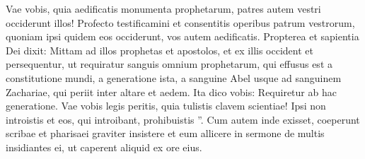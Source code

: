 \begin{biblechapter}
\begin{biblechapter}
\begin{biblechapter}
\begin{biblechapter}
\begin{biblechapter}
\begin{biblechapter}
\begin{biblechapter}
\begin{biblechapter}
\begin{biblechapter}
\begin{biblechapter}
\begin{biblechapter}
\verse Vae vobis, quia aedificatis monumenta prophetarum, patres autem vestri occiderunt illos! 
\verse Profecto testificamini et consentitis operibus patrum vestrorum, quoniam ipsi quidem eos occiderunt, vos autem aedificatis. 
\verse Propterea et sapientia Dei dixit: Mittam ad illos prophetas et apostolos, et ex illis occident et persequentur, 
 \verse ut requiratur sanguis omnium prophetarum, qui effusus est a constitutione mundi, a generatione ista, 
\verse a sanguine Abel usque ad sanguinem Zachariae, qui periit inter altare et aedem. Ita dico vobis: Requiretur ab hac generatione. 
 \verse Vae vobis legis peritis, quia tulistis clavem scientiae! Ipsi non introistis et eos, qui introibant, prohibuistis ”.
 \verse Cum autem inde exisset, coeperunt scribae et pharisaei graviter insistere et eum allicere in sermone de multis 
\verse insidiantes ei, ut caperent aliquid ex ore eius.
 

\end{biblechapter}
\end{biblechapter}
\end{biblechapter}
\end{biblechapter}
\end{biblechapter}
\end{biblechapter}
\end{biblechapter}
\end{biblechapter}
\end{biblechapter}
\end{biblechapter}
\end{biblechapter}
